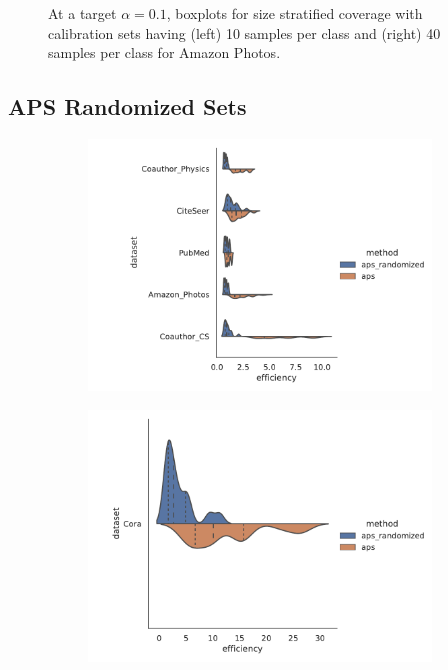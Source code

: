 \begin{figure}
\begin{subfigure}{0.48\linewidth}
    \end{subfigure}
    \caption{At a target $\alpha = 0.1$, boxplots for size stratified coverage with calibration sets having (left) 10 samples per class and (right) 40 samples per class for Amazon Photos.}
    \label{fig:nspc:citeseer:ssc}
\end{figure}

\subsection{APS Randomized Sets}
\begin{figure}
    \centering
    \begin{subfigure}{0.8\linewidth}
    \includegraphics[width=\linewidth,alt={Violin plots comparison randomized and non randomized efficieincy for APS across 5 datasets.}]{graphConformal/figures/split/aps_randomized_efficiency}
    \end{subfigure}
    \begin{subfigure}{0.6\linewidth}
        \includegraphics[width=\linewidth,alt={Violin plots comparison randomized and non randomized efficieincy for APS on Cora.}]{graphConformal/figures/split/aps_randomized_efficiency_cora}

\end{subfigure}
\end{figure}
